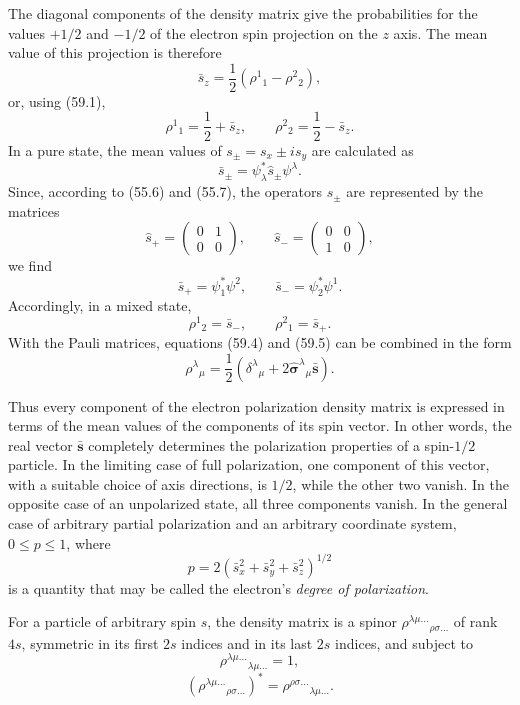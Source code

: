 The diagonal components of the density matrix give the probabilities for the values $+1/2$ and $-1/2$ of the electron spin projection on the $z$ axis. The mean value of this projection is therefore
\[
 \bar s_z=\frac12(\rho^1{}_1-\rho^2{}_2),
\]
or, using (59.1),
\begin{equation}
 \rho^1{}_1=\frac12+\bar s_z,\qquad
 \rho^2{}_2=\frac12-\bar s_z.
 \tag{59.4}
\end{equation}
In a pure state, the mean values of $s_\pm=s_x\pm is_y$ are calculated as
\[
 \bar s_\pm=\psi_\lambda^*\hat s_\pm\psi^\lambda.
\]
Since, according to (55.6) and (55.7), the operators $\hat s_\pm$ are represented by the matrices
\[
 \hat s_+=\begin{pmatrix}0&1\\0&0\end{pmatrix},\qquad
 \hat s_-=\begin{pmatrix}0&0\\1&0\end{pmatrix},
\]
we find
\[
 \bar s_+=\psi_1^*\psi^2,\qquad \bar s_-=\psi_2^*\psi^1.
\]
Accordingly, in a mixed state,
\begin{equation}
 \rho^1{}_2=\bar s_-,\qquad \rho^2{}_1=\bar s_+.
 \tag{59.5}
\end{equation}
With the Pauli matrices, equations (59.4) and (59.5) can be combined in the form
\begin{equation}
 \rho^\lambda{}_\mu=\frac12
 (\delta^\lambda{}_\mu+2\hat{\boldsymbol\sigma}^\lambda{}_\mu\bar{\mathbf s}).
 \tag{59.6}
\end{equation}

Thus every component of the electron polarization density matrix is expressed in terms of the mean values of the components of its spin vector. In other words, the real vector $\bar{\mathbf s}$ completely determines the polarization properties of a spin-$1/2$ particle. In the limiting case of full polarization, one component of this vector, with a suitable choice of axis directions, is $1/2$, while the other two vanish. In the opposite case of an unpolarized state, all three components vanish. In the general case of arbitrary partial polarization and an arbitrary coordinate system, $0\leqslant p\leqslant1$, where
\[
 p=2(\bar s_x^2+\bar s_y^2+\bar s_z^2)^{1/2}
\]
is a quantity that may be called the electron's \emph{degree of polarization}.

For a particle of arbitrary spin $s$, the density matrix is a spinor $\rho^{\lambda\mu\ldots}{}_{\rho\sigma\ldots}$ of rank $4s$, symmetric in its first $2s$ indices and in its last $2s$ indices, and subject to
\begin{equation}
 \rho^{\lambda\mu\ldots}{}_{\lambda\mu\ldots}=1,
 \tag{59.7}
\end{equation}
\begin{equation}
 (\rho^{\lambda\mu\ldots}{}_{\rho\sigma\ldots})^*
 =\rho^{\rho\sigma\ldots}{}_{\lambda\mu\ldots}.
 \tag{59.8}
\end{equation}



